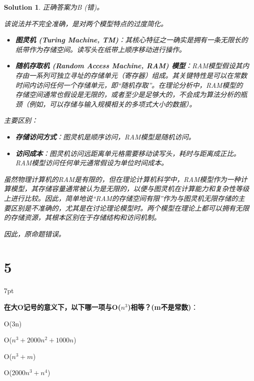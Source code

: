 \documentclass[UTF8]{report}
\newtheorem{solution}{Solution}
\theoremstyle{MyLineTheoremStyle} %
\theoremstyle{MyBlockTheoremStyle} %
\theoremstyle{MySubsubsectionStyle} %
\newenvironment{graybox}{%
        \def\FrameCommand{%
        \hspace{1pt}%
        {\color{gray}\small \vrule width 2pt}%
        {\color{graybox_color}\vrule width 4pt}%
        \colorbox{graybox_color}%
        }%
        \MakeFramed{\advance\hsize-\width\FrameRestore}%
        \noindent\hspace{-4.55pt}%
        \begin{adjustwidth}{}{7pt}%
        \vspace{2pt}\vspace{2pt}%
        }
        {%
        \vspace{2pt}\end{adjustwidth}\endMakeFramed%
        }
\begin{document}
\begin{solution}
正确答案为B (错)。

该说法并不完全准确，是对两个模型特点的过度简化。
\begin{itemize}
    \item \textbf{图灵机 (Turing Machine, TM)}：其核心特征之一确实是拥有一条无限长的纸带作为存储空间。读写头在纸带上顺序移动进行操作。
    \item \textbf{随机存取机 (Random Access Machine, RAM) 模型}：RAM模型假设其内存由一系列可独立寻址的存储单元（寄存器）组成。其关键特性是可以在常数时间内访问任何一个存储单元，即“随机存取”。在理论分析中，RAM模型的存储空间通常也假设是无限的，或者至少是足够大的，不会成为算法分析的瓶颈（例如，可以存储与输入规模相关的多项式大小的数据）。
\end{itemize}
主要区别：
\begin{itemize}
    \item \textbf{存储访问方式}：图灵机是顺序访问，RAM模型是随机访问。
    \item \textbf{访问成本}：图灵机访问远距离单元格需要移动读写头，耗时与距离成正比。RAM模型访问任何单元通常假设为单位时间成本。
\end{itemize}
虽然物理计算机的RAM是有限的，但在理论计算机科学中，RAM模型作为一种计算模型，其存储容量通常被认为是无限的，以便与图灵机在计算能力和复杂性等级上进行比较。因此，简单地说“RAM的存储空间有限”作为与图灵机无限存储的主要区别是不准确的，尤其是在讨论理论模型时。两个模型在理论上都可以拥有无限的存储资源，其根本区别在于存储结构和访问机制。

因此，原命题错误。
\end{solution}

\section*{5}

\begin{graybox}
\textbf{在大O记号的意义下，以下哪一项与O($n^3$)相等？(m不是常数)}：
\begin{circledenum}
    \item O(3n)
    \item O($n^3+2000n^2+1000n$)
    \item O($n^3+m$)
    \item O($2000n^3+n^4$)
\end{circledenum}
\end{graybox}
\end{document}
